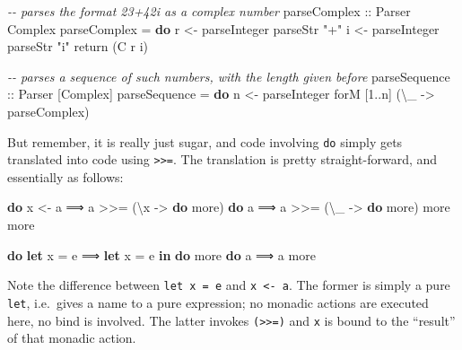 \documentclass[11pt,
  american,
  DIV13]{article}
\newenvironment{Shaded}{}{}
\newcommand{\CommentTok}[1]{\textcolor[rgb]{0.38,0.63,0.69}{\textit{#1}}}
\newcommand{\DataTypeTok}[1]{\textcolor[rgb]{0.56,0.13,0.00}{#1}}
\newcommand{\DecValTok}[1]{\textcolor[rgb]{0.25,0.63,0.44}{#1}}
\newcommand{\FunctionTok}[1]{\textcolor[rgb]{0.02,0.16,0.49}{#1}}
\newcommand{\KeywordTok}[1]{\textcolor[rgb]{0.00,0.44,0.13}{\textbf{#1}}}
\newcommand{\NormalTok}[1]{#1}
\newcommand{\OperatorTok}[1]{\textcolor[rgb]{0.40,0.40,0.40}{#1}}
\newcommand{\OtherTok}[1]{\textcolor[rgb]{0.00,0.44,0.13}{#1}}
\newcommand{\StringTok}[1]{\textcolor[rgb]{0.25,0.44,0.63}{#1}}
\begin{document}
\begin{Shaded}
\begin{Highlighting}[]
\CommentTok{{-}{-} parses the format \textasciigrave{}23+42i\textasciigrave{} as a complex number}
\OtherTok{parseComplex ::} \DataTypeTok{Parser} \DataTypeTok{Complex}
\NormalTok{parseComplex }\OtherTok{=} \KeywordTok{do}
\NormalTok{  r }\OtherTok{\textless{}{-}}\NormalTok{ parseInteger}
\NormalTok{  parseStr }\StringTok{"+"}
\NormalTok{  i }\OtherTok{\textless{}{-}}\NormalTok{ parseInteger}
\NormalTok{  parseStr }\StringTok{"i"}
  \FunctionTok{return}\NormalTok{ (}\DataTypeTok{C}\NormalTok{ r i)}

\CommentTok{{-}{-} parses a sequence of such numbers, with the length given before}
\OtherTok{parseSequence ::} \DataTypeTok{Parser}\NormalTok{ [}\DataTypeTok{Complex}\NormalTok{]}
\NormalTok{parseSequence }\OtherTok{=} \KeywordTok{do}
\NormalTok{  n }\OtherTok{\textless{}{-}}\NormalTok{ parseInteger}
\NormalTok{  forM [}\DecValTok{1}\OperatorTok{..}\NormalTok{n] (\textbackslash{}\_ }\OtherTok{{-}\textgreater{}}\NormalTok{ parseComplex)}
\end{Highlighting}
\end{Shaded}

\newpage

But remember, it is really just sugar, and code involving \texttt{do}
simply gets translated into code using
\texttt{\textgreater{}\textgreater{}=}. The translation is pretty
straight-forward, and essentially as follows:

\begin{Shaded}
\begin{Highlighting}[]
\KeywordTok{do}\NormalTok{ x }\OtherTok{\textless{}{-}}\NormalTok{ a    ⟹  a }\OperatorTok{\textgreater{}\textgreater{}=}\NormalTok{ (\textbackslash{}x }\OtherTok{{-}\textgreater{}} \KeywordTok{do}\NormalTok{ more)       }\KeywordTok{do}\NormalTok{ a   ⟹  a }\OperatorTok{\textgreater{}\textgreater{}=}\NormalTok{ (\textbackslash{}\_ }\OtherTok{{-}\textgreater{}} \KeywordTok{do}\NormalTok{ more)}
\NormalTok{   more                                          more}

\KeywordTok{do} \KeywordTok{let}\NormalTok{ x }\OtherTok{=}\NormalTok{ e ⟹  }\KeywordTok{let}\NormalTok{ x }\OtherTok{=}\NormalTok{ e }\KeywordTok{in} \KeywordTok{do}\NormalTok{ more         }\KeywordTok{do}\NormalTok{ a  ⟹  a}
\NormalTok{   more}
\end{Highlighting}
\end{Shaded}

Note the difference between \texttt{let\ x\ =\ e} and
\texttt{x\ \textless{}-\ a}. The former is simply a pure \texttt{let},
i.e.~gives a name to a pure expression; no monadic actions are executed
here, no bind is involved. The latter invokes
\texttt{(\textgreater{}\textgreater{}=)} and \texttt{x} is bound to the
``result'' of that monadic action.
\end{document}
